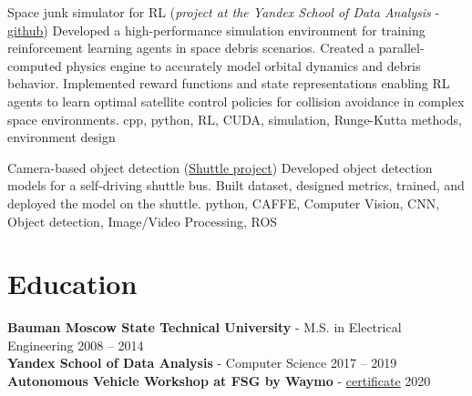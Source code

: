 \documentclass[]{resume}
\begin{document}
\project
{Space junk simulator for RL (\textit{project at the Yandex School of Data Analysis} - \href{https://github.com/neer201/space_junk_simulator}{github})}
{}
{Developed a high-performance simulation environment for training reinforcement learning agents in space debris scenarios. Created a parallel-computed physics engine to accurately model orbital dynamics and debris behavior. Implemented reward functions and state representations enabling RL agents to learn optimal satellite control policies for collision avoidance in complex space environments.}
{cpp, python, RL, CUDA, simulation, Runge-Kutta methods, environment design}

\project
{Camera-based object detection  (\href{https://www.engadget.com/2016/08/28/yandex-teams-on-self-driving-shuttle-bus/}{Shuttle project})}
{}
{Developed object detection models for a self-driving shuttle bus. Built dataset, designed metrics, trained, and deployed the model on the shuttle.}
{python, CAFFE, Computer Vision, CNN, Object detection, Image/Video Processing, ROS}

\section*{\sectionformat Education}
\textbf{Bauman Moscow State Technical University} - M.S. in Electrical Engineering \hfill 2008 -- 2014 \\[0.05cm]
\textbf{Yandex School of Data Analysis} - Computer Science \hfill 2017 -- 2019 \\[0.05cm]
\textbf{Autonomous Vehicle Workshop at FSG by Waymo} - \href{https://drive.google.com/file/d/1-WxECccxBrRWIvEt9WQeXKTueiF658r7/view?usp=sharing}{certificate} \hfill 2020 \\[0.05cm]
\end{document}
